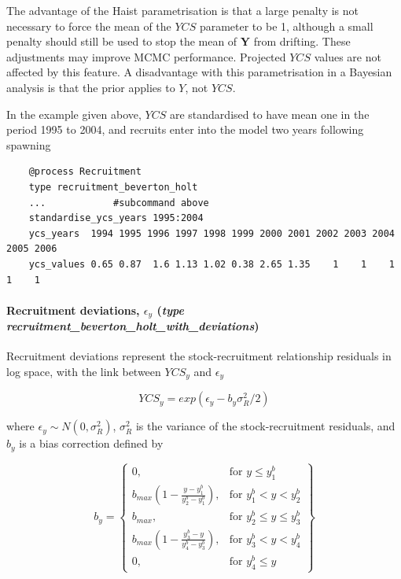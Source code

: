 The advantage of the Haist parametrisation is that a large penalty is not necessary to force the mean of the $YCS$ parameter to be 1, although a small penalty should still be used to stop the mean of \textbf{Y} from drifting. These adjustments may improve MCMC performance. Projected $YCS$ values are not affected by this feature. A disadvantage with this parametrisation in a Bayesian analysis is that the prior applies to $Y$, not $YCS$.

In the  example given above,  $YCS$ are standardised to have mean one in the period 1995 to 2004, and recruits enter into the model two years following spawning

{\small{\begin{verbatim}
	@process Recruitment
	type recruitment_beverton_holt
	...            #subcommand above
	standardise_ycs_years 1995:2004
	ycs_years  1994 1995 1996 1997 1998 1999 2000 2001 2002 2003 2004 2005 2006
	ycs_values 0.65 0.87  1.6 1.13 1.02 0.38 2.65 1.35    1    1    1    1    1
\end{verbatim}}}


\paragraph*{Recruitment deviations, $\epsilon_y$ (\emph{type recruitment\_beverton\_holt\_with\_deviations})} \label{sec:Process-RecruitmentBevertonHoltWithDeviations} 

Recruitment deviations represent the stock-recruitment relationship residuals in log space, with the link between $YCS_y$ and $\epsilon_y$

\begin{equation}\label{eq:recruit_devs}
	YCS_y = exp(\epsilon_y - b_y\sigma^2_R / 2)
\end{equation}

where $\epsilon_y\sim N(0,\sigma^2_R)$, $\sigma^2_R$ is the variance of the stock-recruitment residuals, and $b_y$ is a bias correction defined by \cite{methot2011adjusting}

\begin{equation}\label{eq::bias}
b_y = \left\{\begin{array}{lr}
0, & \text{for }y\leq y_1^b\\
b_{max}(1 - \frac{y - y_1^b}{y_2^b - y_1^b}), & \text{for } y_1^b < y < y_2^b\\
b_{max}, & \text{for } y_2^b\leq y \leq y_3^b\\
b_{max}(1 - \frac{y_3^b - y}{y_4^b - y_3^b}), & \text{for }  y_3^b< y < y_4^b\\
0, & \text{for } y_4^b\leq y
\end{array}\right\}
\end{equation}

